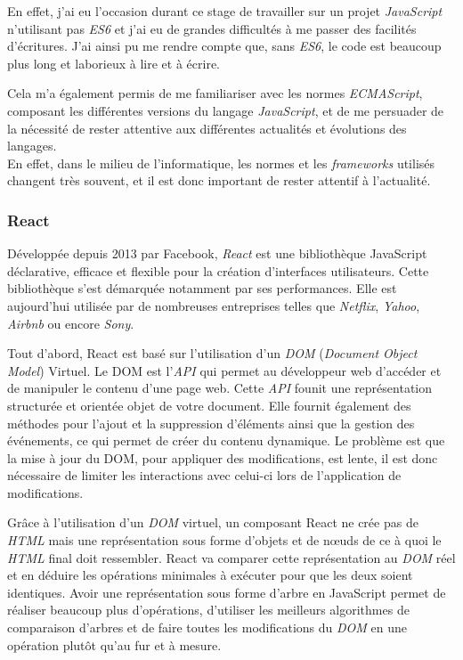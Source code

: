\bigskip

En effet, j'ai eu l'occasion durant ce stage de travailler sur un projet
\emph{JavaScript} n'utilisant pas \emph{ES6} et j'ai eu de grandes
difficultés à me passer des facilités d'écritures. J'ai ainsi pu me
rendre compte que, sans \emph{ES6}, le code est beaucoup plus long et
laborieux à lire et à écrire.

\bigskip

Cela m'a également permis de me familiariser avec les normes
\emph{ECMAScript}, composant les différentes versions du langage
\emph{JavaScript}, et de me persuader de la nécessité de rester
attentive aux différentes actualités et évolutions des langages.\\
En effet, dans le milieu de l'informatique, les normes et les
\emph{frameworks} utilisés changent très souvent, et il est donc
important de rester attentif à l'actualité.

\bigskip

\subsubsection{React}\label{react}

\bigskip

Développée depuis 2013 par Facebook, \emph{React} est une bibliothèque
JavaScript déclarative, efficace et flexible pour la création
d'interfaces utilisateurs. Cette bibliothèque s'est démarquée notamment
par ses performances. Elle est aujourd'hui utilisée par de nombreuses
entreprises telles que \emph{Netflix}, \emph{Yahoo}, \emph{Airbnb} ou
encore \emph{Sony}.

\bigskip

Tout d'abord, React est basé sur l'utilisation d'un \emph{DOM}
(\emph{Document Object Model}) Virtuel. Le DOM est l'\emph{API} qui
permet au développeur web d'accéder et de manipuler le contenu d'une
page web. Cette \emph{API} founit une représentation structurée et
orientée objet de votre document. Elle fournit également des méthodes
pour l'ajout et la suppression d'éléments ainsi que la gestion des
événements, ce qui permet de créer du contenu dynamique. Le problème est
que la mise à jour du DOM, pour appliquer des modifications, est lente,
il est donc nécessaire de limiter les interactions avec celui-ci lors de
l'application de modifications. \bigskip

Grâce à l'utilisation d'un \emph{DOM} virtuel, un composant React ne
crée pas de \emph{HTML} mais une représentation sous forme d'objets et
de nœuds de ce à quoi le \emph{HTML} final doit ressembler. React va
comparer cette représentation au \emph{DOM} réel et en déduire les
opérations minimales à exécuter pour que les deux soient identiques.
Avoir une représentation sous forme d'arbre en JavaScript permet de
réaliser beaucoup plus d'opérations, d'utiliser les meilleurs
algorithmes de comparaison d'arbres et de faire toutes les modifications
du \emph{DOM} en une opération plutôt qu'au fur et à mesure.

